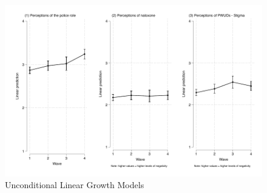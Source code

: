 \begin{landscape}

\end{landscape}


\begin{figure}
    \centering
    \caption{\centering Unconditional Linear Growth Models}
    \includegraphics{figures/growth_models.pdf}
\end{figure}



\begin{landscape}
    
\end{landscape}

